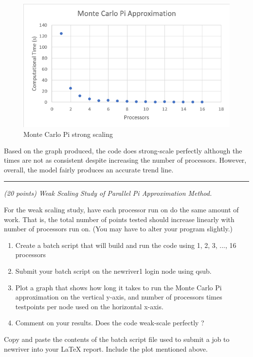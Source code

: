 \documentclass{article}
\newcommand{\myhrule}{ \begin{center}\rule{.9\linewidth}{.25mm}\end{center} }
\newcommand{\pad}{\vspace{8pt}\noindent}
\begin{document}
\begin{figure}[ht!]
    \centering
    \includegraphics{monte_carlo_pi_times.png}
    \caption{Monte Carlo Pi strong scaling}
    \label{fig:monte_carlo_graph}
\end{figure}

Based on the graph produced, the code does strong-scale perfectly although the times are not as consistent despite increasing the number of processors.  However, overall, the model fairly produces an accurate trend line.

\myhrule

\pad {\bf Q4} {\it (20 points) Weak Scaling Study of Parallel Pi Approximation Method.}
\vspace{8pt} 

\noindent For the weak scaling study, have each processor run on do the same amount of work. That is, the total number of points tested should increase linearly with number of processors run on. (You may have to alter your program slightly.)
\begin{enumerate}
    \item Create a batch script that will build and run the code using 1, 2, 3, ..., 16 processors
    \item Submit your batch script on the newriver1 login node using qsub. 
    \item Plot a graph that shows how long it takes to run the Monte Carlo Pi approximation on the vertical y-axis, and number of processors times testpoints per node used on the horizontal x-axis.
    \item Comment on your results. Does the code weak-scale perfectly ?
\end{enumerate}

\noindent Copy and paste the contents of the batch script file used to submit a job to newriver into your \LaTeX{} report. Include the plot mentioned above.  \\
\end{document}
